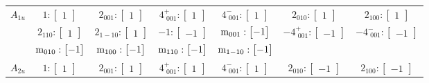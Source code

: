 \documentclass[fleqn,8pt,landscape]{jsarticle}
\begin{document}
\begin{longtable}{ccccccc}
$ A_{1u} $ & $ 1:\begin{bmatrix} 1 \end{bmatrix} $ & $ 2{}_{001}:\begin{bmatrix} 1 \end{bmatrix} $ & $ 4^{+}_{\,\,001}:\begin{bmatrix} 1 \end{bmatrix} $ & $ 4^{-}_{\,\,001}:\begin{bmatrix} 1 \end{bmatrix} $ & $ 2{}_{010}:\begin{bmatrix} 1 \end{bmatrix} $ & $ 2{}_{100}:\begin{bmatrix} 1 \end{bmatrix} $ \\
& $ 2{}_{110}:\begin{bmatrix} 1 \end{bmatrix} $ & $ 2{}_{1-10}:\begin{bmatrix} 1 \end{bmatrix} $ & $ -1:\begin{bmatrix} -1 \end{bmatrix} $ & $ {\rm m}_{001}:\begin{bmatrix} -1 \end{bmatrix} $ & $ -4^{+}_{\,\,001}:\begin{bmatrix} -1 \end{bmatrix} $ & $ -4^{-}_{\,\,001}:\begin{bmatrix} -1 \end{bmatrix} $ \\
& $ {\rm m}_{010}:\begin{bmatrix} -1 \end{bmatrix} $ & $ {\rm m}_{100}:\begin{bmatrix} -1 \end{bmatrix} $ & $ {\rm m}_{110}:\begin{bmatrix} -1 \end{bmatrix} $ & $ {\rm m}_{1-10}:\begin{bmatrix} -1 \end{bmatrix} $ & $  $ & $  $ \\ \hline
$ A_{2u} $ & $ 1:\begin{bmatrix} 1 \end{bmatrix} $ & $ 2{}_{001}:\begin{bmatrix} 1 \end{bmatrix} $ & $ 4^{+}_{\,\,001}:\begin{bmatrix} 1 \end{bmatrix} $ & $ 4^{-}_{\,\,001}:\begin{bmatrix} 1 \end{bmatrix} $ & $ 2{}_{010}:\begin{bmatrix} -1 \end{bmatrix} $ & $ 2{}_{100}:\begin{bmatrix} -1 \end{bmatrix} $ \\

\end{longtable}
\end{document}
